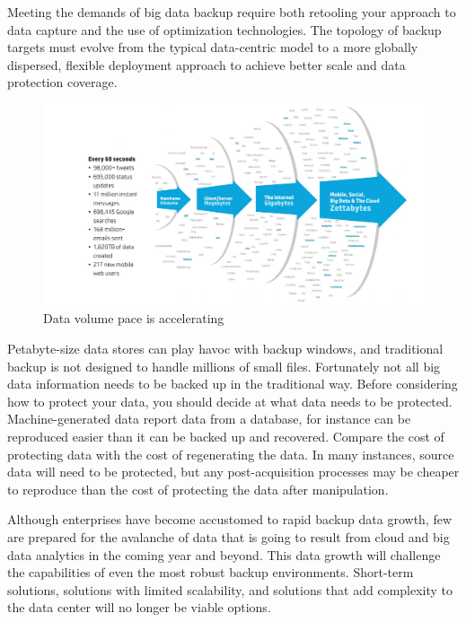 Meeting the demands of big data backup require both retooling your
approach to data capture and the use of optimization technologies. The
topology of backup targets must evolve from the typical data-centric
model to a more globally dispersed, flexible deployment approach to
achieve better scale and data protection coverage.

\begin{figure}[t]
    \begin{center}
        \includegraphics[scale=0.3]{images/graph3.png}
    \end{center}
    \caption{Data volume pace is accelerating}
    \label{fig:graph3}
\end{figure}

Petabyte-size data stores can play havoc with backup windows, and
traditional backup is not designed to handle millions of small files.
Fortunately not all big data information needs to be backed up in the
traditional way. Before considering how to protect your data, you should
decide at what data needs to be protected. Machine-generated data
report data from a database, for instance can be reproduced easier
than it can be backed up and recovered. Compare the cost of protecting
data with the cost of regenerating the data. In many instances, source
data will need to be protected, but any post-acquisition processes may
be cheaper to reproduce than the cost of protecting the data after
manipulation.

Although enterprises have become accustomed to rapid backup data growth,
few are prepared for the avalanche of data that is going to result from
cloud and big data analytics in the coming year and beyond. This data
growth will challenge the capabilities of even the most robust backup
environments. Short-term solutions, solutions with limited scalability,
and solutions that add complexity to the data center will no longer be
viable options.


